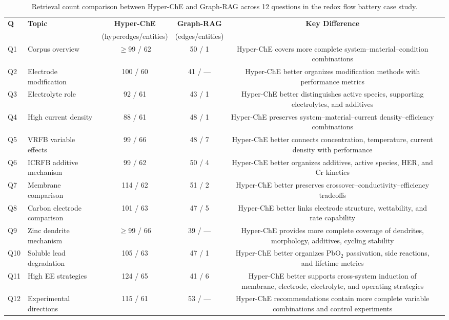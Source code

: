 \begin{table}[htbp]
\centering
\caption{Retrieval count comparison between Hyper-ChE and Graph-RAG across 12 questions in the redox flow battery case study.}
\label{tab:retrieval_comparison}
\begin{tabular}{@{}llcccp{4.8cm}@{}}
\toprule
\textbf{Q} & \textbf{Topic} & \textbf{Hyper-ChE} & \textbf{Graph-RAG} & \textbf{Key Difference} \\
 & & (hyperedges/entities) & (edges/entities) & \\
\midrule
Q1 & Corpus overview & $\geq$99 / 62 & 50 / 1 & Hyper-ChE covers more complete system--material--condition combinations \\
Q2 & Electrode modification & 100 / 60 & 41 / --- & Hyper-ChE better organizes modification methods with performance metrics \\
Q3 & Electrolyte role & 92 / 61 & 43 / 1 & Hyper-ChE better distinguishes active species, supporting electrolytes, and additives \\
Q4 & High current density & 88 / 61 & 48 / 1 & Hyper-ChE preserves system--material--current density--efficiency combinations \\
Q5 & VRFB variable effects & 99 / 66 & 48 / 7 & Hyper-ChE better connects concentration, temperature, current density with performance \\
Q6 & ICRFB additive mechanism & 99 / 62 & 50 / 4 & Hyper-ChE better organizes additives, active species, HER, and Cr kinetics \\
Q7 & Membrane comparison & 114 / 62 & 51 / 2 & Hyper-ChE better preserves crossover--conductivity--efficiency tradeoffs \\
Q8 & Carbon electrode comparison & 101 / 63 & 47 / 5 & Hyper-ChE better links electrode structure, wettability, and rate capability \\
Q9 & Zinc dendrite mechanism & $\geq$99 / 66 & 39 / --- & Hyper-ChE provides more complete coverage of dendrites, morphology, additives, cycling stability \\
Q10 & Soluble lead degradation & 105 / 63 & 47 / 1 & Hyper-ChE better organizes PbO$_2$ passivation, side reactions, and lifetime metrics \\
Q11 & High EE strategies & 124 / 65 & 41 / 6 & Hyper-ChE better supports cross-system induction of membrane, electrode, electrolyte, and operating strategies \\
Q12 & Experimental directions & 115 / 61 & 53 / --- & Hyper-ChE recommendations contain more complete variable combinations and control experiments \\
\bottomrule
\end{tabular}
\end{table}


